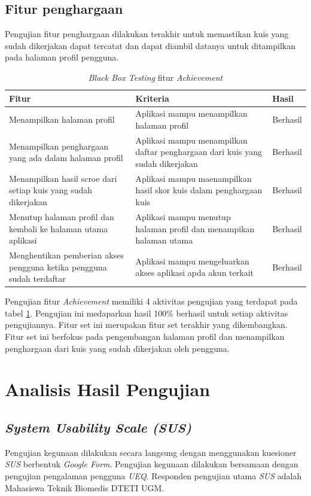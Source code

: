 \subsection{Fitur penghargaan}
Pengujian fitur penghargaan dilakukan terakhir untuk memastikan kuis yang sudah dikerjakan dapat tercatat dan dapat diambil datanya untuk ditampilkan pada halaman profil pengguna.
\begin{table}[H]
	\caption{\textit{Black Box Testing} fitur \textit{Achievement}}
	\label{Tab:blackBoxAchie}
	\begin{tabular}{|p{}|p{}|p{}|}
		\hline
		 \centering\textbf{Fitur} & \multicolumn{1}{m{0.45\textwidth}|}{\centering \textbf{Kriteria}}&  \multicolumn{1}{m{0.1\textwidth}|}{\centering \textbf{Hasil}}\\
		\hline
		Menampilkan halaman profil
		& Aplikasi mampu menampilkan halaman profil 
		& Berhasil\\
		\hline
		Menampilkan penghargaan yang ada dalam halaman profil
		& Aplikasi mampu menampilkan daftar penghargaan dari kuis yang sudah dikerjakan
		& Berhasil\\
		\hline
		Menampilkan hasil scroe dari setiap kuis yang sudah dikerjakan
		& Aplikasi mampu maenampilkan hasil skor kuis dalam penghargaan kuis
		& Berhasil\\
		\hline
		Menutup halaman profil dan kembali ke halaman utama aplikasi
		&Aplikasi mampu menutup halaman profil dan menampikan halaman utama
		& Berhasil\\
		\hline
		Menghentikan pemberian akses pengguna ketika pengguna sudah terdaftar
		& Aplikasi mampu mengeluarkan akses aplikasi apda akun terkait
		& Berhasil\\
		\hline
	\end{tabular}
\end{table}
Pengujian fitur \textit{Achievement} memiliki 4 aktivitas pengujian yang terdapat pada tabel \ref*{Tab:blackBoxAchie}.
Pengujian ini medaparkan hasil 100\% berhasil untuk setiap aktivitas pengujiannya. Fitur set ini merupakan fitur set terakhir yang dikembangkan.
Fitur set ini berfokus pada pengembangan halaman profil dan menampilkan penghargaan dari kuis yang sudah dikerjakan oleh pengguna.
\newpage
\section{Analisis Hasil Pengujian}
\subsection{\textit{System Usability Scale (SUS)}}
Pengujian kegunaan dilakukan secara langsung dengan menggunakan kuesioner \textit{SUS} berbentuk \textit{Google Form}.
Pengujian kegunaan dilakukan bersamaan dengan pengujian pengalaman pengguna \textit{UEQ}.
Responden pengujian utama \textit{SUS} adalah Mahasiswa Teknik Biomedis DTETI UGM. 

